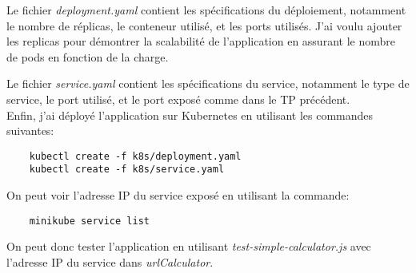 \documentclass{article}
\begin{document}
Le fichier \textit{deployment.yaml} contient les spécifications du déploiement, notamment le nombre de réplicas, le conteneur utilisé, et les ports utilisés. J'ai voulu ajouter les replicas pour démontrer la scalabilité de l'application en assurant le nombre de pods en fonction de la charge.

Le fichier \textit{service.yaml} contient les spécifications du service, notamment le type de service, le port utilisé, et le port exposé comme dans le TP précédent. \\

Enfin, j'ai déployé l'application sur Kubernetes en utilisant les commandes suivantes:
\begin{verbatim}
    kubectl create -f k8s/deployment.yaml
    kubectl create -f k8s/service.yaml
\end{verbatim}

On peut voir l'adresse IP du service exposé en utilisant la commande:
\begin{verbatim}
    minikube service list
\end{verbatim}

On peut donc tester l'application en utilisant \textit{test-simple-calculator.js} avec l'adresse IP du service dans \textit{urlCalculator}.
\end{document}
